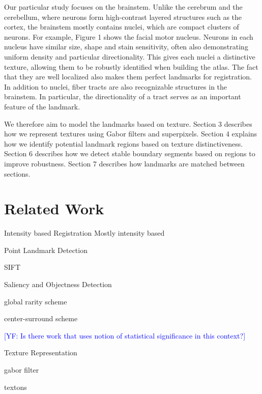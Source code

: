 \documentclass{llncs}
\newcommand{\authcmt}[2]{\textcolor{#1}{#2}}
\newcommand{\yoav}[1]{\authcmt{blue}{[YF: #1]}}
\begin{document}
Our particular study focuses on the brainstem. Unlike the cerebrum and the cerebellum, where neurons form high-contrast layered structures such as the cortex, the brainstem mostly contains nuclei, which are compact clusters of neurons. For example, Figure 1 shows the facial motor nucleus. Neurons in each nucleus have similar size, shape and stain sensitivity, often also demonstrating uniform density and particular directionality. This gives each nuclei a distinctive texture, allowing them to be robustly identified when building the atlas. The fact that they are well localized also makes them perfect landmarks for registration. In addition to nuclei, fiber tracts are also recognizable structures in the brainstem. In particular, the directionality of a tract serves as an important feature of the landmark.

We therefore aim to model the landmarks based on texture. Section 3 describes how we represent textures using Gabor filters and superpixels. Section 4 explains how we identify potential landmark regions based on texture distinctiveness. Section 6 describes how we detect stable boundary segments based on regions to improve robustness. Section 7 describes how landmarks are matched between sections.

%
%

\section{Related Work}

\begin{description}

\item{Intensity based Registration}
Mostly intensity based


\item{Point Landmark Detection}

SIFT

\item{Saliency and Objectness Detection}

global rarity scheme

center-surround scheme

\yoav{Is there work that uses notion of statistical significance in
  this context?}

\item{Texture Representation}

gabor filter

textons


\end{description}
\end{document}

